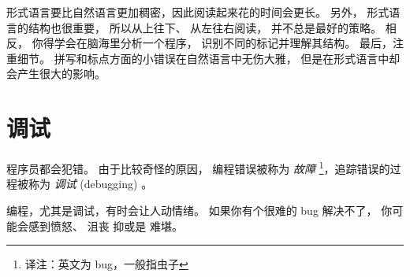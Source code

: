 
形式语言要比自然语言更加稠密，因此阅读起来花的时间会更长。  
另外， 形式语言的结构也很重要， 所以从上往下、 从左往右阅读， 并不总是最好的策略。  
相反， 你得学会在脑海里分析一个程序， 识别不同的标记并理解其结构。  
最后，注重细节。  拼写和标点方面的小错误在自然语言中无伤大雅， 
但是在形式语言中却会产生很大的影响。

\section{调试}
  


程序员都会犯错。  
由于比较奇怪的原因， 编程错误被称为 {\em 故障} \footnote{译注：英文为 bug，一般指虫子}，追踪错误的过程被称为 {\em 调试} (debugging) 。

  
  


编程，尤其是调试，有时会让人动情绪。  
如果你有个很难的 bug 解决不了， 你可能会感到愤怒、 沮丧 抑或是 难堪。


